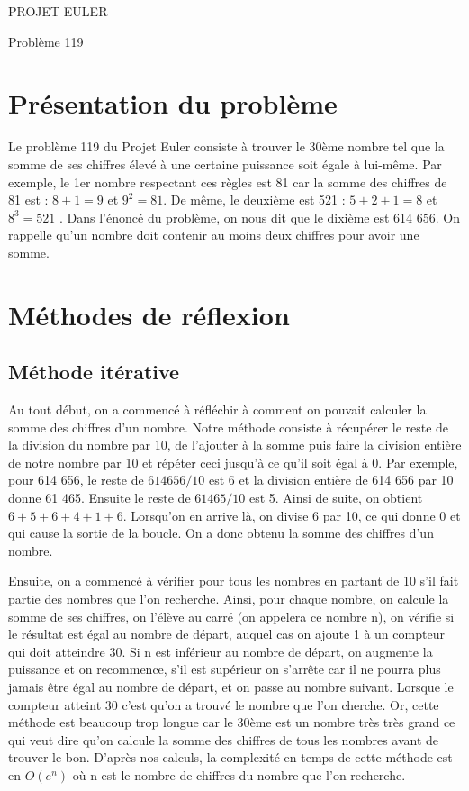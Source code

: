 \documentclass{article}
\begin{document}
\hfill
\hfill
\hfill
\begin{center}
  \large{PROJET EULER}

  Problème 119
\end{center}
\tableofcontents
\vspace{2.2cm}
\section {Présentation du problème}

Le problème 119 du Projet Euler consiste à trouver le 30ème nombre tel que la somme de ses chiffres élevé à une certaine puissance soit égale à lui-même. Par exemple, le 1er nombre respectant ces règles est 81 car la somme des chiffres de 81 est : $ 8 + 1 = 9 $ et $ 9^{2} = 81 $. De même, le deuxième est 521 : $ 5 + 2 + 1 = 8 $ et $ 8^{3} = 521 $	. Dans l'énoncé du problème, on nous dit que le dixième est 614 656. On rappelle qu'un nombre doit contenir au moins deux chiffres pour avoir une somme. 

\section{Méthodes de réflexion}

\subsection{Méthode itérative}

Au tout début, on a commencé à réfléchir à comment on pouvait calculer la somme des chiffres d'un nombre. Notre méthode consiste à récupérer le reste de la division du nombre par 10, de l'ajouter à la somme puis faire la division entière de notre nombre par 10 et répéter ceci jusqu'à ce qu'il soit égal à 0. Par exemple, pour 614 656, le reste de $614656/10$ est 6 et la division entière de 614 656 par 10 donne 61 465. Ensuite le reste de $61465/10$ est 5. Ainsi de suite, on obtient $6 + 5 + 6 + 4 + 1 + 6$. Lorsqu'on en arrive là, on divise 6 par 10, ce qui donne 0 et qui cause la sortie de la boucle. On a donc obtenu la somme des chiffres d'un nombre. 
\newline

Ensuite, on a commencé à  vérifier pour tous les nombres en partant de 10 s'il fait partie des nombres que l'on recherche. Ainsi, pour chaque nombre, on calcule la somme de ses chiffres, on l'élève au carré (on appelera ce nombre n), on vérifie si le résultat est égal au nombre de départ, auquel cas on ajoute 1 à un compteur qui doit atteindre 30. Si n est inférieur au nombre de départ, on augmente la puissance et on recommence, s'il est supérieur on s'arrête car il ne pourra plus jamais être égal au nombre de départ, et on passe au nombre suivant. Lorsque le compteur atteint 30 c'est qu'on a trouvé le nombre que l'on cherche. Or, cette méthode est beaucoup trop longue car le 30ème est un nombre très très grand ce qui veut dire qu'on calcule la somme des chiffres de tous les nombres avant de trouver le bon. D'après nos calculs, la complexité en temps de cette méthode est en $O(e^{n})$  où n est le nombre de chiffres du nombre que l'on recherche.
\end{document}
